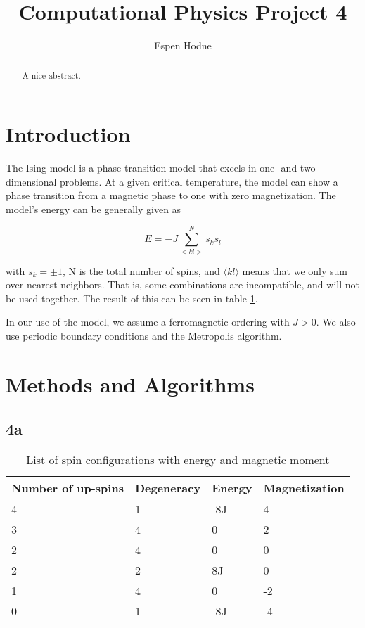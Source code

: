 \documentclass[10pt,showpacs,preprintnumbers,footinbib,amsmath,amssymb,aps,prl,twocolumn,groupedaddress,superscriptaddress,showkeys]{revtex4-1}
\newcommand{\suml}[2]{\sum\limits_{#1}^{#2}}
\begin{document}
\title[CPP2]{Computational Physics Project 4}

\author{Espen Hodne} 


\begin{abstract}

A nice abstract.

\end{abstract}



\maketitle



\section{Introduction}

The Ising model is a phase transition model that excels in one- and two-dimensional problems. At a given critical temperature, the model can show a phase transition from a magnetic phase to one with zero magnetization. The model's energy can be generally given as

\begin{equation}
E = -J\suml{<kl>}{N}s_k s_l
\end{equation}

with $s_k = \pm 1$, N is the total number of spins, and $\langle kl \rangle$ means that we only sum over nearest neighbors. That is, some combinations are incompatible, and will not be used together. The result of this can be seen in table \ref{tab:energies}.

In our use of the model, we assume a ferromagnetic ordering with $J > 0$. We also use periodic boundary conditions and the Metropolis algorithm.

\section{Methods and Algorithms} %


\subsection*{4a}

\begin{table}[!h]
\caption{List of spin configurations with energy and magnetic moment}
\begin{tabular}{|l|l|l|l|}
\hline
Number of up-spins & Degeneracy & Energy & Magnetization\\
\hline
4&1&-8J&4\\
\hline
3&4&0&2\\
\hline
2&4&0&0\\
\hline
2&2&8J&0\\
\hline
1&4&0&-2\\
\hline
0&1&-8J&-4\\
\hline
\end{tabular}
\label{tab:energies}
\end{table}
\end{document}
